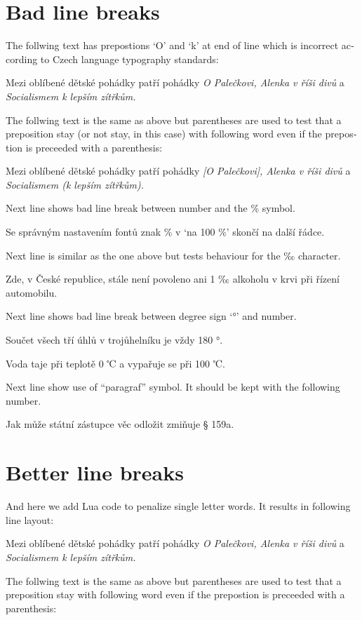 \documentclass{article}
\newcommand{\expl}[1]{\begin{english}\sffamily #1\end{english}}
\begin{document}
\section{Bad line breaks}
\expl{The follwing text has prepostions `O' and `k' at end of line which
  is incorrect according to Czech language typography standards:}

Mezi oblíbené dětské pohádky patří pohádky \emph{O Palečkovi, Alenka v říši
  divů} a \emph{Socialismem k lepším zítřkům.}

\expl{The follwing text is the same as above but parentheses are used to test
  that a preposition stay (or not stay, in this case) with following word
  even if the prepostion is preceeded with a parenthesis:}

Mezi oblíbené dětské pohádky patří pohádky \emph{[O Palečkovi], Alenka v říši
  divů} a \emph{Socialismem (k lepším zítřkům).}

\expl{Next line shows bad line break between number and the \% symbol.}

Se správným nastavením fontů znak \% v `na 100 \%' skončí na další řádce.

\expl{Next line is similar as the one above but tests behaviour for the ‰
  character.}

Zde, v České republice, stále není povoleno ani 1 ‰ alkoholu v krvi při
řízení automobilu.

\expl{Next line shows bad line break between degree sign `°' and number.}

Součet všech tří úhlů v trojůhelníku je vždy 180 °.

Voda taje při teplotě 0 ℃ a vypařuje se při 100 ℃.

\expl{Next line show use of ``paragraf'' symbol. It should be kept with the
  following number.}

Jak může státní zástupce věc odložit zmiňuje § 159a.

\section{Better line breaks}
\expl{And here we add Lua code to penalize single letter words. It results in
following line layout:}

\cstypoSingleLetterEnable{}
\cstypoPercentsEnable{}
\cstypoALetterEnable{}
\cstypoParagraphEnable{}
Mezi oblíbené dětské pohádky patří pohádky \emph{O Palečkovi, Alenka v říši
  divů} a \emph{Socialismem k lepším zítřkům.}

\expl{The follwing text is the same as above but parentheses are used to test
  that a preposition stay with following word even if the prepostion is
  preceeded with a parenthesis:}
\end{document}
